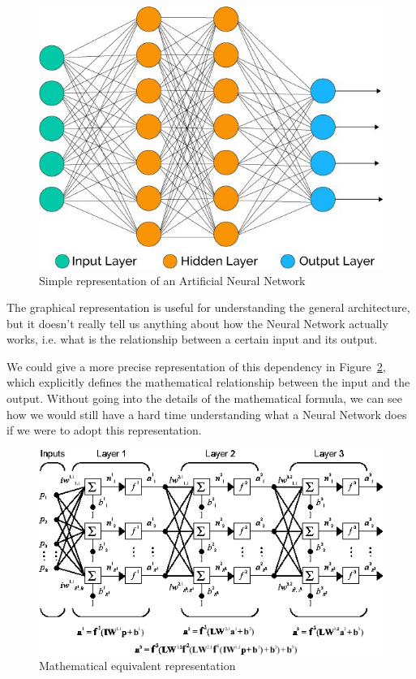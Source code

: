 \documentclass[conference]{IEEEtran}
\begin{document}
\begin{figure}[ht!] \centering \includegraphics[width=0.8 \linewidth]{images/nn}
    \caption{Simple representation of an Artificial Neural Network}
    \label{fig:nn} \end{figure}

The graphical representation is useful for understanding the general
architecture, but it doesn't really tell us anything about
how the Neural Network actually works, i.e. what is the relationship between a
certain input and its output.

We could give a more precise representation of this dependency in
Figure~\ref{fig:mathnn}, which explicitly defines the mathematical relationship
between the input and the output. Without going into the details of the
mathematical formula, we can see how we would still have a hard time
understanding what a Neural Network does if we were to adopt this
representation.

\begin{figure}[ht!] \centering
    \includegraphics[width=0.9\linewidth]{images/nmodel} \caption{Mathematical
        equivalent representation} \label{fig:mathnn} \end{figure}
\end{document}
